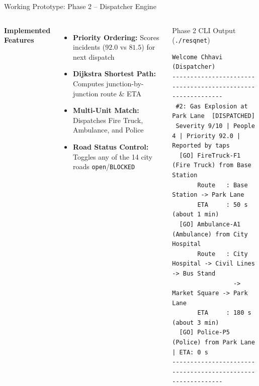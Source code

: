 \documentclass[aspectratio=169,11pt]{beamer}
\begin{document}
\begin{frame}[fragile]{Working Prototype: Phase 2 -- Dispatcher Engine}
\footnotesize
\begin{columns}[T,totalwidth=\textwidth]
\textbf{\normalsize\color{GEUBlue}Implemented Features}
\begin{itemize}\itemsep2pt
\item \textbf{Priority Ordering:} Scores incidents ($92.0$ vs $81.5$) for next dispatch
\item \textbf{Dijkstra Shortest Path:} Computes junction-by-junction route \& ETA
\item \textbf{Multi-Unit Match:} Dispatches Fire Truck, Ambulance, and Police
\item \textbf{Road Status Control:} Toggles any of the 14 city roads \texttt{open}/\texttt{BLOCKED}
\end{itemize}
\begin{block}{Phase 2 CLI Output (\texttt{./resqnet})}
\tiny
\begin{verbatim}
Welcome Chhavi (Dispatcher)
------------------------------------------------------------
 #2: Gas Explosion at Park Lane  [DISPATCHED]
 Severity 9/10 | People 4 | Priority 92.0 | Reported by taps
  [GO] FireTruck-F1 (Fire Truck) from Base Station
       Route   : Base Station -> Park Lane
       ETA     : 50 s (about 1 min)
  [GO] Ambulance-A1 (Ambulance) from City Hospital
       Route   : City Hospital -> Civil Lines -> Bus Stand
                 -> Market Square -> Park Lane
       ETA     : 180 s (about 3 min)
  [GO] Police-P5 (Police) from Park Lane | ETA: 0 s
------------------------------------------------------------
\end{verbatim}
\end{block}
\end{columns}
\end{frame}
\end{document}
